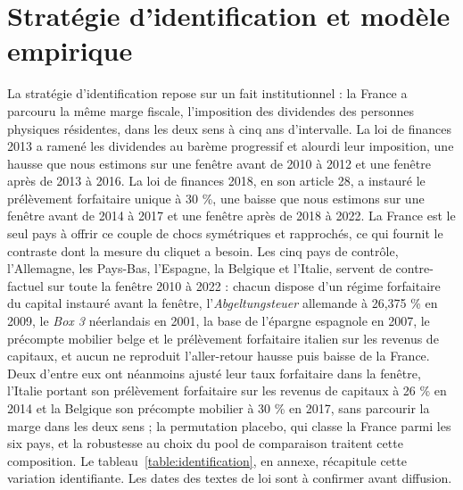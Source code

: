 \section{Stratégie d'identification et modèle empirique}\label{sec:modele}

La stratégie d'identification repose sur un fait institutionnel : la France a parcouru la même marge
fiscale, l'imposition des dividendes des personnes physiques résidentes, dans les deux sens à cinq
ans d'intervalle. La loi de finances 2013 a ramené les dividendes au barème progressif et alourdi
leur imposition, une hausse que nous estimons sur une fenêtre avant de 2010 à 2012 et une fenêtre
après de 2013 à 2016. La loi de finances 2018, en son article 28, a instauré le prélèvement
forfaitaire unique à 30 \%, une baisse que nous estimons sur une fenêtre avant de 2014 à 2017 et une
fenêtre après de 2018 à 2022. La France est le seul pays à offrir ce couple de chocs symétriques et
rapprochés, ce qui fournit le contraste dont la mesure du cliquet a besoin. Les cinq pays de
contrôle, l'Allemagne, les Pays-Bas, l'Espagne, la Belgique et l'Italie, servent de contre-factuel
sur toute la fenêtre 2010 à 2022 : chacun dispose d'un régime forfaitaire du capital instauré avant
la fenêtre, l'\textit{Abgeltungsteuer} allemande à 26,375 \% en 2009, le \textit{Box 3} néerlandais
en 2001, la base de l'épargne espagnole en 2007, le précompte mobilier belge et le
prélèvement forfaitaire italien sur les revenus de capitaux, et aucun ne reproduit l'aller-retour hausse puis baisse de la France. Deux d'entre
eux ont néanmoins ajusté leur taux forfaitaire dans la fenêtre, l'Italie portant son
prélèvement forfaitaire sur les revenus de capitaux à 26 \% en 2014 et la Belgique son précompte mobilier à 30 \% en 2017, sans parcourir la
marge dans les deux sens ; la permutation placebo, qui classe la France parmi les six pays, et la
robustesse au choix du pool de comparaison traitent cette composition. Le
tableau~\ref{table:identification}, en annexe, récapitule cette variation identifiante. Les dates
des textes de loi sont à confirmer avant diffusion.

